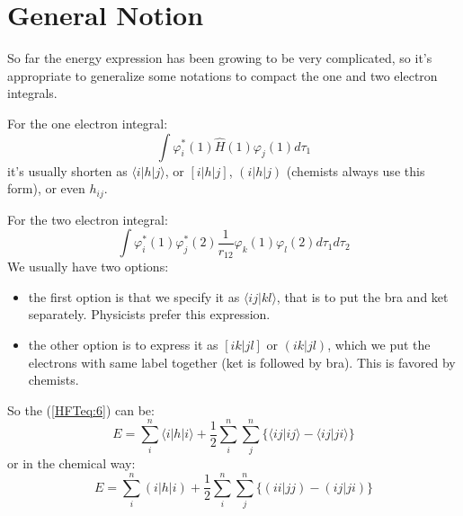 \section{General Notion}\label{General_Notion_Hatree-Fock}
%
%
%
%
So far the energy expression has been growing to be very
complicated, so it's appropriate to generalize some notations to
compact the one and two electron integrals.

For the one electron integral:
\begin{equation}\label{HFTeq:28}
\int \varphi^{*}_{i}(1)\hat{H}(1)\varphi_{j}(1) d\tau_{1}
\end{equation}
it's usually shorten as $\langle i|h|j \rangle$, or $[ i|h|j ]$,
$(i|h|j)$ (chemists always use this form), or even $h_{ij}$.

For the two electron integral:
\begin{equation}\label{HFTeq:29}
\int
\varphi^{*}_{i}(1)\varphi^{*}_{j}(2)\frac{1}{r_{12}}\varphi_{k}(1)\varphi_{l}(2)
d\tau_{1} d\tau_{2}
\end{equation}
We usually have two options:
\begin{itemize}
 \item the first option is that we specify it as $\langle ij|kl \rangle$, that
is to put the bra and ket separately. Physicists prefer this expression.
 \item the other option is to express it as $[ ik|jl ]$ or $(ik|jl)$, which we
put the electrons with same label together (ket is followed by bra). This is
favored by chemists.
\end{itemize}

So the (\ref{HFTeq:6}) can be:
\begin{equation}\label{HFTeq:24}
E = \sum^{n}_{i} \langle i|h|i \rangle +
\frac{1}{2}\sum^{n}_{i}\sum^{n}_{j} \{\langle ij|ij \rangle -\langle
ij|ji \rangle \}
\end{equation}
or in the chemical way:
\begin{equation}\label{HFTeq:24-1}
E = \sum^{n}_{i} ( i|h|i ) +
\frac{1}{2}\sum^{n}_{i}\sum^{n}_{j} \{( ii|jj ) -(
ij|ji ) \}
\end{equation}

